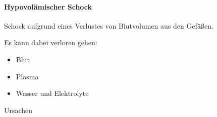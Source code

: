 \documentclass{article}
\begin{document}
\paragraph{Hypovol\"amischer Schock}
{\mdseries
Schock aufgrund eines Verlustes von Blutvolumen aus den Gef\"a{\ss}en.}

{\mdseries
Es kann dabei verloren gehen: }

\begin{itemize}
\item {\mdseries
Blut}

\item {\mdseries
Plasma}

\item {\mdseries
Wasser und Elektrolyte}

\end{itemize}
{\mdseries\color{black}
Ursachen}
\end{document}

